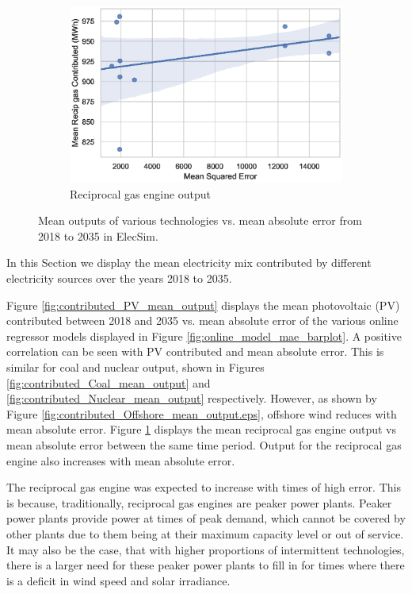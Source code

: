 \begin{figure}
\begin{subfigure}{0.3\textwidth}
		\includegraphics[width=1\columnwidth]{Chapter5/figures/market-forecasting/results/elecsim_results/results_2/contributed_Recip_gas_mean_output.eps}
		\caption{Reciprocal gas engine output}
		\label{fig:contributed_Recip_gas_mean_output}
	\end{subfigure}
	\label{fig:pv_coal_nuclear_offshore_outputs}
	\caption{Mean outputs of various technologies vs. mean absolute error from 2018 to 2035 in ElecSim.}
\end{figure}

In this Section we display the mean electricity mix contributed by different electricity sources over the years 2018 to 2035. 

Figure \ref{fig:contributed_PV_mean_output} displays the mean photovoltaic (PV) contributed between 2018 and 2035 vs. mean absolute error of the various online regressor models displayed in Figure \ref{fig:online_model_mae_barplot}. A positive correlation can be seen with PV contributed and mean absolute error. This is similar for coal and nuclear output, shown in Figures \ref{fig:contributed_Coal_mean_output} and \ref{fig:contributed_Nuclear_mean_output} respectively. However, as shown by Figure \ref{fig:contributed_Offshore_mean_output.eps}, offshore wind reduces with mean absolute error. Figure \ref{fig:contributed_Recip_gas_mean_output} displays the mean reciprocal gas engine output vs mean absolute error between the same time period. Output for the reciprocal gas engine also increases with mean absolute error.

The reciprocal gas engine was expected to increase with times of high error. This is because, traditionally, reciprocal gas engines are peaker power plants. Peaker power plants provide power at times of peak demand, which cannot be covered by other plants due to them being at their maximum capacity level or out of service. It may also be the case, that with higher proportions of intermittent technologies, there is a larger need for these peaker power plants to fill in for times where there is a deficit in wind speed and solar irradiance.


